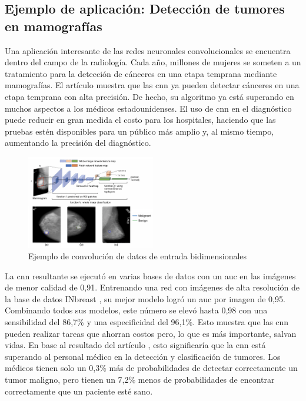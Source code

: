 \subsection*{Ejemplo de aplicación: Detección de tumores en mamografías}
\label{subsec:ejemplos-aplicacion-cnn}

Una aplicación interesante de las redes neuronales convolucionales se encuentra dentro del campo de la radiología. Cada año, millones de mujeres se someten a un tratamiento para la detección de cánceres en una etapa temprana mediante mamografías. El artículo \cite{mammography2019} muestra que las \gls{cnn} ya pueden detectar cánceres en una etapa temprana con alta precisión. De hecho, su algoritmo ya está superando en muchos aspectos a los médicos estadounidenses. El uso de \gls{cnn} en el diagnóstico puede reducir en gran medida el costo para los hospitales, haciendo que las pruebas estén disponibles para un público más amplio y, al mismo tiempo, aumentando la precisión del diagnóstico.

\begin{figure}[ht]
\centering
\includegraphics[width=0.5\textwidth]{img/chapters/estado-del-arte/cnn-mamografia.png}
\caption{\label{fig:ejemplo-mamografia}Ejemplo de convolución de datos de entrada bidimensionales \cite{ankile2020deep}}
\end{figure}

La \gls{cnn} resultante se ejecutó en varias bases de datos con un \gls{auc} en las imágenes de menor calidad de 0,91. Entrenando una red con imágenes de alta resolución de la base de datos INbreast \cite{moreira2011}, su mejor modelo logró un \gls{auc} por imagen de 0,95. Combinando todos sus modelos, este número se elevó hasta 0,98 con una sensibilidad del 86,7\% y una especificidad del 96,1\%. Esto muestra que las \gls{cnn} pueden realizar tareas que ahorran costos pero, lo que es más importante, salvan vidas. En base al resultado del artículo \cite{mammography2019}, esto significaría que la \gls{cnn} está superando al personal médico en la detección y clasificación de tumores. Los médicos tienen solo un 0,3\% más de probabilidades de detectar correctamente un tumor maligno, pero tienen un 7,2\% menos de probabilidades de encontrar correctamente que un paciente esté sano.


